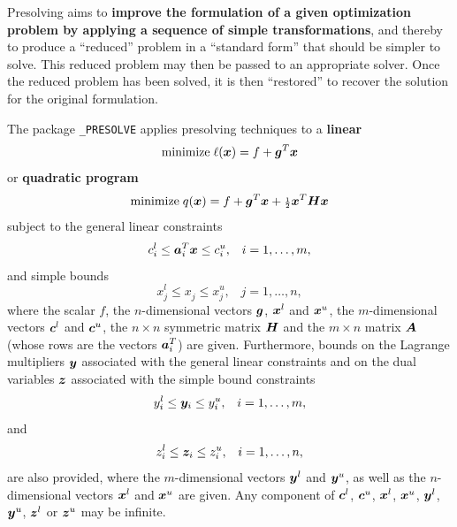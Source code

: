 \documentclass{galahad}
\newcommand{\packagename}{PRESOLVE}
\newcommand{\fullpackagename}{\libraryname\_\packagename}
\begin{document}
\galheader


\galsummary

Presolving aims to {\bf improve the formulation of a given optimization
  problem by applying a sequence of simple transformations}, and thereby
to produce a ``reduced'' problem in a ``standard form'' that should be
simpler to solve.  This reduced problem may then be passed to an
appropriate solver.  Once the reduced problem has been solved, it is
then ``restored'' to recover the solution for the original formulation.

The package {\tt \fullpackagename} applies presolving techniques to a
{\bf linear}
\begin{equation}\label{objlp}
{\rm minimize}\;  \ell({\bm{x}}) = f + {\bm{g}}^T {\bm{x}}
\end{equation}
or {\bf quadratic program}
\begin{equation}\label{objqp}
{\rm minimize}\;  q({\bm{x}}) = f + {\bm{g}}^T {\bm{x}} + {\scriptstyle \frac{1}{2}} {\bm{x}}^T {\bm{H}} {\bm{x}}
\end{equation}
subject to the general linear constraints
\begin{equation}\label{gcqp}
c_{i}^{l}  \leq  {\bm{a}}_{i}^{T}{\bm{x}}  \leq  c_{i}^{u}, \;\;\; i = 1, \ldots , m,
\end{equation}
and simple bounds
\begin{equation}\label{vbqp}
x_{j}^{l}  \leq  x_{j}^{ } \leq  x_{j}^{u} , \;\;\; j = 1, \ldots , n,
\end{equation}
where the scalar $f$, the $n$-dimensional vectors ${\bm{g}}$, ${\bm{x}}^l$ and
${\bm{x}}^u$, the $m$-dimensional vectors ${\bm{c}}^l$ and ${\bm{c}}^u$,
the $n \times n$ symmetric matrix ${\bm{H}}$ and the $m \times n$ matrix ${\bm{A}}$
(whose rows are the vectors ${\bm{a}}_{i}^T$) are
given. Furthermore, bounds on the Lagrange multipliers ${\bm{y}}$ associated with
the general linear constraints and on the dual variables ${\bm{z}}$ associated
with the simple bound constraints
\[
y_{i}^{l}  \leq  {\bm{y}}_{i}  \leq  y_{i}^{u}, \;\;\;  i = 1, \ldots , m,
\]
and
\[
z_{i}^{l}  \leq  {\bm{z}}_{i}  \leq  z_{i}^{u}, \;\;\;  i = 1, \ldots , n,
\]
are also provided, where the $m$-dimensional vectors ${\bm{y}}^l$ and
${\bm{y}}^u$, as well as the $n$-dimensional vectors ${\bm{x}}^l$ and ${\bm{x}}^u$
are given.  Any component of ${\bm{c}}^l$, ${\bm{c}}^u$, ${\bm{x}}^l$, ${\bm{x}}^u$,
${\bm{y}}^l$, ${\bm{y}}^u$, ${\bm{z}}^l$ or ${\bm{z}}^u$ may be infinite.

\end{document}
